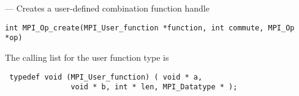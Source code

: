 \startmanpage
{}
--- Creates a user-defined combination function handle 
\startvb\begin{verbatim}
int MPI_Op_create(MPI_User_function *function, int commute, MPI_Op *op)

\end{verbatim}
\endvb

\par
{}
\par
{}
The calling list for the user function type is
\begin{verbatim}
 typedef void (MPI_User_function) ( void * a, 
               void * b, int * len, MPI_Datatype * ); 
\end{verbatim}

